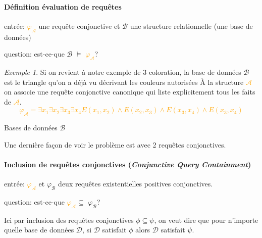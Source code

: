 \documentclass[a4paper,12pt]{article}
\theoremstyle{definition}
\theoremstyle{remark}
\newtheorem*{exemple}{Exemple}%
\begin{document}
\begin{framed}
  \paragraph{Définition évaluation de requêtes}
  \begin{compactitem}
  \item entrée: \textcolor{orange}{$\varphi_\mathcal{A}$} une requête
    conjonctive et \textcolor{OliveGreen}{$\mathcal{B}$} une structure
    relationnelle (une base de données)
  \item question: est-ce-que \textcolor{OliveGreen}{$\mathcal{B}$}
    $\models$ \textcolor{orange}{$\varphi_\mathcal{A}$}?
  \end{compactitem}
\end{framed}
\begin{exemple}
  Si on revient à notre exemple de 3 coloration, la base de données $\mathcal{B}$
  est le triangle qu'on a déjà vu décrivant les couleurs autorisées
  À la structure \textcolor{orange}{$\mathcal{A}$} on associe une requête conjonctive
  canonique qui liste explicitement tous les faits de \textcolor{orange}{$\mathcal{A}$}. 
  \textcolor{orange}{$$\varphi_\mathcal{A}= \exists x_1 \exists x_2 \exists x_3
    \exists x_4 E(x_1,x_2) \land E(x_2,x_3) \land E(x_3,x_4) \land
    E(x_3,x_4)$$}
  \textcolor{OliveGreen}{Bases de données $\mathcal{B}$}
\end{exemple}

Une dernière façon de voir le problème est avec 2 requêtes
conjonctives. 
\begin{framed}
  \paragraph{Inclusion de requêtes conjonctives (\textsl{Conjunctive
      Query Containment})}
  \begin{compactitem}
  \item entrée: \textcolor{orange}{$\varphi_\mathcal{A}$} et
    \textcolor{OliveGreen}{$\varphi_\mathcal{B}$} deux requêtes
    existentielles positives conjonctives.
  \item question: est-ce-que
    \textcolor{orange}{$\varphi_\mathcal{A}$}$\subseteq$
    \textcolor{OliveGreen}{$\varphi_\mathcal{B}$}?
  \end{compactitem}
\end{framed}
Ici par inclusion des requêtes conjonctives $\phi\subseteq \psi$, on veut dire que pour n'importe quelle
base de données $\mathcal{D}$, si $\mathcal{D}$ satisfait $\phi$ alors
$\mathcal{D}$ satisfait $\psi$.
\end{document}
